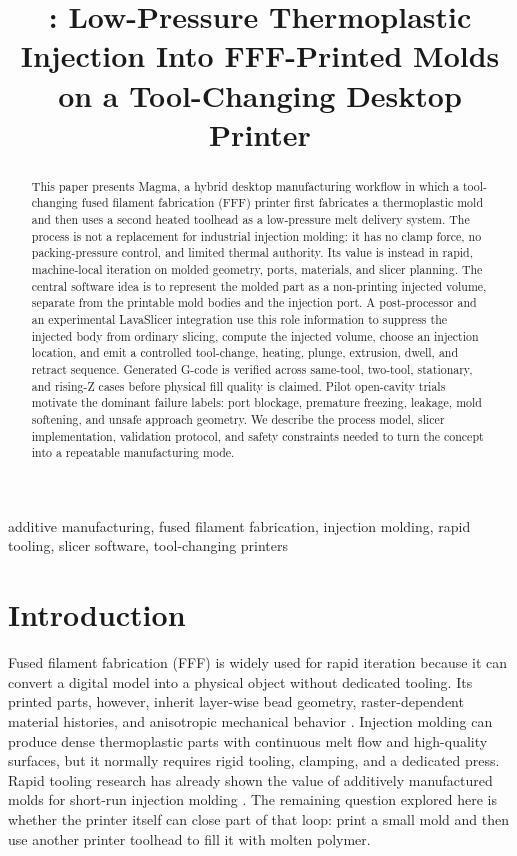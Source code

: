 \documentclass[conference]{IEEEtran}
\title{\magma: Low-Pressure Thermoplastic Injection Into FFF-Printed Molds on a Tool-Changing Desktop Printer}
\author{
\IEEEauthorblockN{Brian Machado\IEEEauthorrefmark{1},
Clayton Haight\IEEEauthorrefmark{2},
Ethan Childerhose\IEEEauthorrefmark{3}, and
Samuel Sun\IEEEauthorrefmark{3}}
\IEEEauthorblockA{\IEEEauthorrefmark{1}Bracket Bot Research, San Francisco, CA, USA, brian@bracketbot.com}
\IEEEauthorblockA{\IEEEauthorrefmark{2}sunday.ai, Mountain View, CA, USA}
\IEEEauthorblockA{\IEEEauthorrefmark{3}Steinmetz Motors, San Francisco, CA, USA}
}
\newcommand{\magma}{Magma}
\begin{document}
\maketitle

\begin{abstract}
This paper presents \magma, a hybrid desktop manufacturing workflow in which a tool-changing fused filament fabrication (FFF) printer first fabricates a thermoplastic mold and then uses a second heated toolhead as a low-pressure melt delivery system. The process is not a replacement for industrial injection molding: it has no clamp force, no packing-pressure control, and limited thermal authority. Its value is instead in rapid, machine-local iteration on molded geometry, ports, materials, and slicer planning. The central software idea is to represent the molded part as a non-printing injected volume, separate from the printable mold bodies and the injection port. A post-processor and an experimental LavaSlicer integration use this role information to suppress the injected body from ordinary slicing, compute the injected volume, choose an injection location, and emit a controlled tool-change, heating, plunge, extrusion, dwell, and retract sequence. Generated G-code is verified across same-tool, two-tool, stationary, and rising-Z cases before physical fill quality is claimed. Pilot open-cavity trials motivate the dominant failure labels: port blockage, premature freezing, leakage, mold softening, and unsafe approach geometry. We describe the process model, slicer implementation, validation protocol, and safety constraints needed to turn the concept into a repeatable manufacturing mode.
\end{abstract}

\begin{IEEEkeywords}
additive manufacturing, fused filament fabrication, injection molding, rapid tooling, slicer software, tool-changing printers
\end{IEEEkeywords}

\section{Introduction}
Fused filament fabrication (FFF) is widely used for rapid iteration because it can convert a digital model into a physical object without dedicated tooling. Its printed parts, however, inherit layer-wise bead geometry, raster-dependent material histories, and anisotropic mechanical behavior \cite{dizonMechanical}. Injection molding can produce dense thermoplastic parts with continuous melt flow and high-quality surfaces, but it normally requires rigid tooling, clamping, and a dedicated press. Rapid tooling research has already shown the value of additively manufactured molds for short-run injection molding \cite{dizonMolds,dizonTechnologies}. The remaining question explored here is whether the printer itself can close part of that loop: print a small mold and then use another printer toolhead to fill it with molten polymer.
\end{document}
